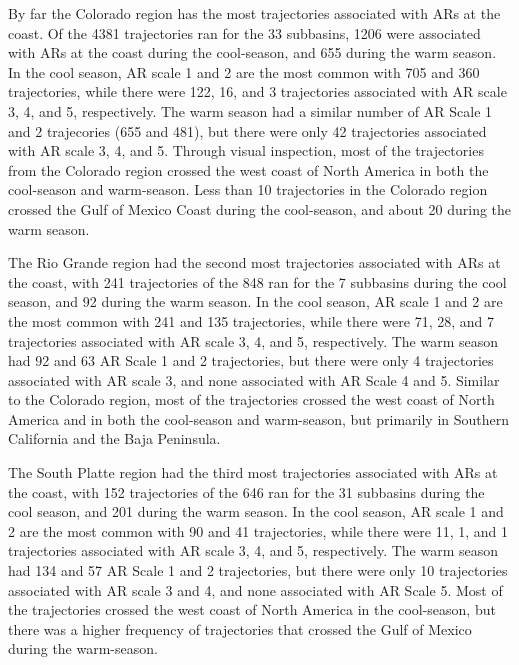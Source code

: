 \documentclass[draft]{agujournal2019}
\begin{document}
By far the Colorado region has the most trajectories associated with ARs at the coast. Of the 4381 trajectories ran for the 33 subbasins, 1206 were associated with ARs at the coast during the cool-season, and 655 during the warm season. In the cool season, AR scale 1 and 2 are the most common with 705 and 360 trajectories, while there were 122, 16, and 3 trajectories associated with AR scale 3, 4, and 5, respectively. The warm season had a similar number of AR Scale 1 and 2 trajecories (655 and 481), but there were only 42 trajectories associated with AR scale 3, 4, and 5. Through visual inspection, most of the trajectories from the Colorado region crossed the west coast of North America in both the cool-season and warm-season. Less than 10 trajectories in the Colorado region crossed the Gulf of Mexico Coast during the cool-season, and about 20 during the warm season. 

The Rio Grande region had the second most trajectories associated with ARs at the coast, with 241 trajectories of the 848 ran for the 7 subbasins during the cool season, and 92 during the warm season. In the cool season, AR scale 1 and 2 are the most common with 241 and 135 trajectories, while there were 71, 28, and 7 trajectories associated with AR scale 3, 4, and 5, respectively. The warm season had 92 and 63 AR Scale 1 and 2 trajectories, but there were only 4 trajectories associated with AR scale 3, and none associated with AR Scale 4 and 5. Similar to the Colorado region, most of the trajectories crossed the west coast of North America and in both the cool-season and warm-season, but primarily in Southern California and the Baja Peninsula. 

The South Platte region had the third most trajectories associated with ARs at the coast, with 152 trajectories of the 646 ran for the 31 subbasins during the cool season, and 201 during the warm season. In the cool season, AR scale 1 and 2 are the most common with 90 and 41 trajectories, while there were 11, 1, and 1 trajectories associated with AR scale 3, 4, and 5, respectively. The warm season had 134 and 57 AR Scale 1 and 2 trajectories, but there were only 10 trajectories associated with AR scale 3 and 4, and none associated with AR Scale 5. Most of the trajectories crossed the west coast of North America in the cool-season, but there was a higher frequency of trajectories that crossed the Gulf of Mexico during the warm-season.
\end{document}
